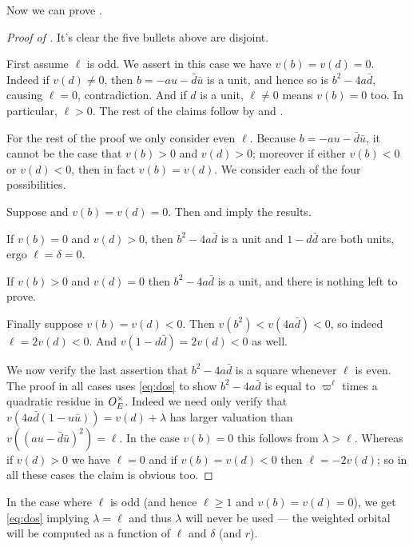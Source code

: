 Now we can prove .
\begin{proof}[Proof of ]
  It's clear the five bullets above are disjoint.
  \begin{itemize}
  \ii First assume $\ell$ is odd.
  We assert in this case we have $v(b) = v(d) = 0$.
  Indeed if $v(d) \neq 0$, then $b = -au-\bar d\bar u$ is a unit,
  and hence so is $b^2 - 4 a \bar d$, causing $\ell = 0$, contradiction.
  And if $d$ is a unit, $\ell \neq 0$ means $v(b) = 0$ too.
  In particular, $\ell > 0$.
  The rest of the claims follow by  and .
  \end{itemize}
  For the rest of the proof we only consider even $\ell$.
  Because $b = -au - \bar d \bar u$, it cannot be the case that $v(b) > 0$ and $v(d) > 0$;
  moreover if either $v(b) < 0$ or $v(d) < 0$,
  then in fact $v(b) = v(d)$.
  We consider each of the four possibilities.
  \begin{itemize}
  \ii Suppose and $v(b) = v(d) = 0$.
  Then  and  imply the results.

  \ii If $v(b) = 0$ and $v(d) > 0$, then $b^2 - 4a \bar d$ is a unit
  and $1 - d \bar d$ are both units, ergo $\ell = \delta = 0$.

  \ii If $v(b) > 0$ and $v(d) = 0$ then $b^2 - 4 a \bar d$ is a unit,
  and there is nothing left to prove.

  \ii Finally suppose $v(b) = v(d) < 0$.
  Then $v(b^2) < v(4 a \bar d) < 0$, so indeed $\ell = 2 v(d) < 0$.
  And $v(1 - d \bar d) = 2v(d) < 0$ as well.
  \end{itemize}
  We now verify the last assertion that $b^2 - 4 a \bar d$
  is a square whenever $\ell$ is even.
  The proof in all cases uses \eqref{eq:dos} to show $b^2 - 4 a \bar d$
  is equal to $\varpi^\ell$ times a quadratic residue in $O_E^\times$.
  Indeed we need only verify that $v(4a \bar d(1 - u \bar u)) = v(d) + \lambda$
  has larger valuation than $v\left( (a u - \bar d \bar u)^2 \right) = \ell$.
  In the case $v(b) = 0$ this follows from $\lambda > \ell$.
  Whereas if $v(d) > 0$ we have $\ell = 0$
  and if $v(b) = v(d) < 0$ then $\ell = -2v(d)$;
  so in all these cases the claim is obvious too. \qedhere
\end{proof}

In the case where $\ell$ is odd (and hence $\ell \ge 1$ and $v(b) = v(d) = 0$),
we get \eqref{eq:dos} implying $\lambda = \ell$
and thus $\lambda$ will never be used --- the weighted orbital will be computed
as a function of $\ell$ and $\delta$ (and $r$).

